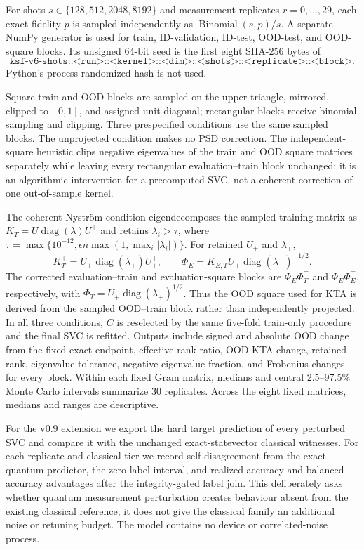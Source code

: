 \documentclass[referee,lineno,pdflatex,sn-nature]{sn-jnl}
\theoremstyle{thmstyleone}%
\theoremstyle{thmstyletwo}%
\theoremstyle{thmstylethree}%
\begin{document}
For shots $s\in\{128,512,2048,8192\}$ and measurement replicates $r=0,\ldots,29$, each exact fidelity $p$ is sampled independently as $\operatorname{Binomial}(s,p)/s$. A separate NumPy generator is used for train, ID-validation, ID-test, OOD-test, and OOD-square blocks. Its unsigned 64-bit seed is the first eight SHA-256 bytes of
\[
\texttt{ksf-v6-shots::<run>::<kernel>::<dim>::<shots>::<replicate>::<block>}.
\]
Python's process-randomized hash is not used.

Square train and OOD blocks are sampled on the upper triangle, mirrored, clipped to $[0,1]$, and assigned unit diagonal; rectangular blocks receive binomial sampling and clipping. Three prespecified conditions use the same sampled blocks. The unprojected condition makes no PSD correction. The independent-square heuristic clips negative eigenvalues of the train and OOD square matrices separately while leaving every rectangular evaluation--train block unchanged; it is an algorithmic intervention for a precomputed SVC, not a coherent correction of one out-of-sample kernel.

The coherent Nystr{\"o}m condition eigendecomposes the sampled training matrix as $K_T=U\operatorname{diag}(\lambda)U^\top$ and retains $\lambda_i>\tau$, where $\tau=\max\{10^{-12},\epsilon n\max(1,\max_i|\lambda_i|)\}$. For retained $U_+$ and $\lambda_+$,
\[
K_T^+=U_+\operatorname{diag}(\lambda_+)U_+^\top,\qquad
\Phi_E=K_{E,T}U_+\operatorname{diag}(\lambda_+)^{-1/2}.
\]
The corrected evaluation--train and evaluation-square blocks are $\Phi_E\Phi_T^\top$ and $\Phi_E\Phi_E^\top$, respectively, with $\Phi_T=U_+\operatorname{diag}(\lambda_+)^{1/2}$. Thus the OOD square used for KTA is derived from the sampled OOD--train block rather than independently projected. In all three conditions, $C$ is reselected by the same five-fold train-only procedure and the final SVC is refitted. Outputs include signed and absolute OOD change from the fixed exact endpoint, effective-rank ratio, OOD-KTA change, retained rank, eigenvalue tolerance, negative-eigenvalue fraction, and Frobenius changes for every block. Within each fixed Gram matrix, medians and central 2.5--97.5\% Monte Carlo intervals summarize 30 replicates. Across the eight fixed matrices, medians and ranges are descriptive.

For the v0.9 extension we export the hard target prediction of every perturbed SVC and compare it with the unchanged exact-statevector classical witnesses. For each replicate and classical tier we record self-disagreement from the exact quantum predictor, the zero-label interval, and realized accuracy and balanced-accuracy advantages after the integrity-gated label join. This deliberately asks whether quantum measurement perturbation creates behaviour absent from the existing classical reference; it does not give the classical family an additional noise or retuning budget. The model contains no device or correlated-noise process.
\end{document}

